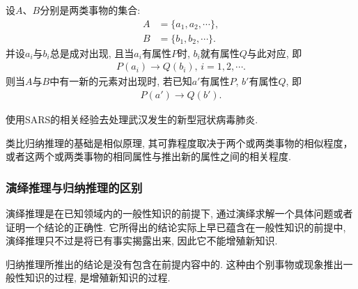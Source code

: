设$A$、$B$分别是两类事物的集合:
\begin{align*}
  A&=\{a_1,a_2,\cdots\},\\
  B&=\{b_1,b_2,\cdots\}.
\end{align*}
并设$a_i$与$b_i$总是成对出现, 且当$a_i$有属性$P$时, $b_i$就有属性$Q$与此对应, 即
\begin{align*}
  P(a_i)\rightarrow Q(b_i),\,i=1,2,\cdots.
\end{align*}
     则当$A$与$B$中有一新的元素对出现时, 若已知$a'$有属性$P$, $b'$有属性$Q$, 即
\begin{align*}
  P(a')\rightarrow Q(b').
\end{align*}
\begin{example}
  使用SARS的相关经验去处理武汉发生的新型冠状病毒肺炎.
\end{example}
\begin{remark}
类比归纳推理的基础是相似原理, 其可靠程度取决于两个或两类事物的相似程度，或者这两个或两类事物的相同属性与推出新的属性之间的相关程度.
\end{remark}
\subsubsection{演绎推理与归纳推理的区别}
演绎推理是在已知领域内的一般性知识的前提下, 通过演绎求解一个具体问题或者证明一个结论的正确性. 它所得出的结论实际上早已蕴含在一般性知识的前提中, 演绎推理只不过是将已有事实揭露出来, 因此它不能增殖新知识.

归纳推理所推出的结论是没有包含在前提内容中的. 这种由个别事物或现象推出一般性知识的过程, 是增殖新知识的过程.

